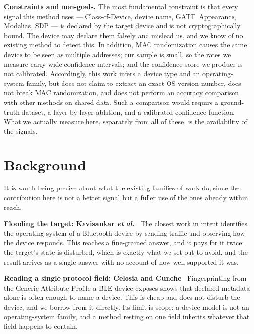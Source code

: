 \documentclass[conference]{IEEEtran}
\begin{document}
\noindent\textbf{Constraints and non-goals.} The most fundamental constraint
is that every signal this method uses --- Class-of-Device, device name,
GATT~Appearance, Modalias, SDP --- is declared by the target device and is not
cryptographically bound. The device may declare them falsely and mislead us,
and we know of no existing method to detect this. In addition, MAC
randomization causes the same device to be seen as multiple addresses; our
sample is small, so the rates we measure carry wide confidence intervals; and
the confidence score we produce is not calibrated. Accordingly, this work
infers a device type and an operating-system family, but does not claim to
extract an exact OS version number, does not break MAC randomization, and does
not perform an accuracy comparison with other methods on shared data. Such a
comparison would require a ground-truth dataset, a layer-by-layer ablation,
and a calibrated confidence function. What we actually measure here,
separately from all of these, is the availability of the signals.

\section{Background}\label{sec:related}
It is worth being precise about what the existing families of work do, since
the contribution here is not a better signal but a fuller use of the ones
already within reach.

\textbf{Flooding the target: Kavisankar \emph{et al.}}~\cite{kavisankar2024osid}
The closest work in intent identifies the operating system of a
Bluetooth device by sending traffic and observing how the device responds.
This reaches a fine-grained answer, and it pays for it twice: the target's
state is disturbed, which is exactly what we set out to avoid, and the result
arrives as a single answer with no account of how well supported it was.

\textbf{Reading a single protocol field: Celosia and Cunche}~\cite{celosia2019gatt}
Fingerprinting from the Generic Attribute Profile a BLE device exposes shows
that declared metadata alone is often enough to name a device. This is cheap and
does not disturb the device, and we borrow from it directly. Its limit is
scope: a device model is not an operating-system family, and a method resting
on one field inherits whatever that field happens to contain.
\end{document}
